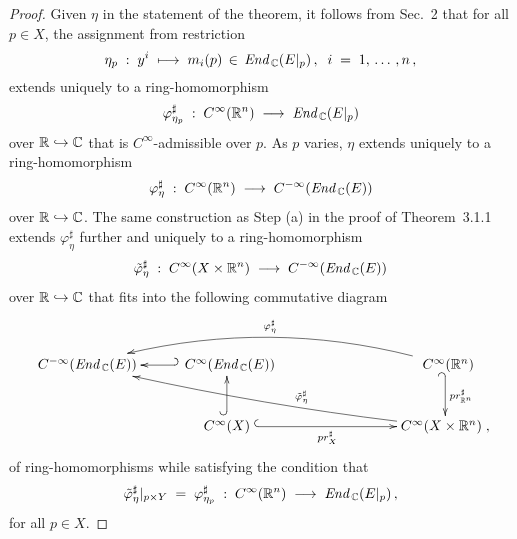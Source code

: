 \documentclass[11pt]{article}
\numberwithin{equation}{subsection}
\newcommand{\End}{\mbox{\it End}\,}
\begin{document}
\begin{proof}
 Given $\eta$ in the statement of the theorem,
  it follows from Sec.~2 that
    for all $p\in X$, the assignment from restriction
    $$
     \eta_p\;:\; y^i\; \longmapsto\; m_i(p)\,\in\,  \End_{\Bbb C}(E|_p)\,,\;\;
	  i\;=\;1,\,\ldots\,,n\,,
    $$	
    extends uniquely to a ring-homomorphism
    $$
      \varphi^{\sharp}_{\eta_p}\;:\;
	   C^{\infty}({\Bbb R}^n)\; \longrightarrow\;   \End_{\Bbb C}(E|_p)
    $$
    over ${\Bbb R}\hookrightarrow {\Bbb C}$ that is $C^{\infty}$-admissible over $p$.
 As $p$ varies,  $\eta$ extends uniquely to a ring-homomorphism
    $$
     \varphi_{\eta}^{\sharp}\;:\;
  	  C^{\infty}({\Bbb R}^n)\; \longrightarrow\;
	  C^{-{\infty}}(\End_{\Bbb C}(E))
    $$
    over ${\Bbb R}\hookrightarrow {\Bbb C}$.
 The same construction as Step (a) in the proof of Theorem~3.1.1
   extends $\varphi_{\eta}^{\sharp}$ further and uniquely to a ring-homomorphism
     $$
	    \tilde{\varphi}_{\eta}^{\sharp}\;:\;
	      C^{\infty}(X\times {\Bbb R}^n)\; \longrightarrow\;
		  C^{-{\infty}}(\End_{\Bbb C}(E))
	 $$
	 over ${\Bbb R}\hookrightarrow {\Bbb C}$
	that fits into the following commutative diagram
	 $$
      \xymatrix{
        \hspace{1ex}
         C^{-\infty}(\End_{\Bbb C}(E))
	       &  \hspace{1ex}C^{\infty}(\End_{\Bbb C}(E))\ar @{_{(}->}[l]
	      &&& \rule{0ex}{3ex}\hspace{1ex}
	               C^{\infty}({\Bbb R}^n)\ar@/_2em/[llll]_-{\varphi_{\eta}^{\sharp}}
	                               \ar @{_{(}->}[d]^{pr_{{\Bbb R}^n}^{\sharp}}        \\	
       & \rule{0ex}{2.4ex}
	        \;C^{\infty}(X)\; \ar @{^{(}->}[rrr]_-{pr_X^{\sharp}} \ar@{^{(}->}[u]
	       &&& C^{\infty}(X\times {\Bbb R}^n) 	
		                    \ar @/^1ex /  [ullll]_(.4){\tilde{\varphi}_{\eta}^{\sharp}}\;,
	   }
     $$
	of ring-homomorphisms while satisfying the condition that
	 $$
        \tilde{\varphi}_{\eta}^{\sharp}|_{{p}\times Y}\;=\;
	    \varphi_{\eta_p}^{\sharp}\;
		:\;  C^{\infty}({\Bbb R}^n)\;\longrightarrow\; \End_{\Bbb C}(E|_p)\,,
     $$
     for all $p\in X$.
	

\end{proof}
\end{document}
